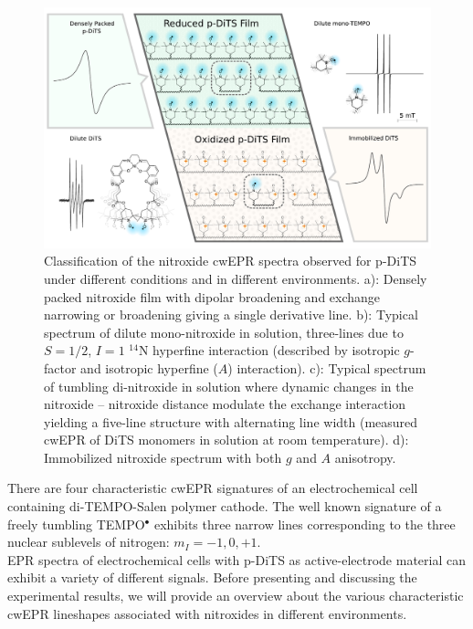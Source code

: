 \begin{figure}[H]
\center
	\includegraphics[width=1\textwidth]{./operando_epr/figures/Cartoon_ALL.pdf}
	\caption{Classification of the nitroxide cwEPR spectra observed for p-DiTS under different conditions and in different environments. a): Densely packed nitroxide film with dipolar broadening and exchange narrowing or broadening giving a single derivative line. b): Typical spectrum of dilute mono-nitroxide in solution, three-lines due to $S=1/2$, $I=1$ $^{14}$N hyperfine interaction (described by isotropic $g$-factor and isotropic hyperfine ($A$) interaction). c): Typical spectrum of tumbling di-nitroxide in solution where dynamic changes in the nitroxide -- nitroxide distance modulate the exchange interaction yielding a five-line structure with alternating line width (measured cwEPR of DiTS monomers in solution at room temperature). d): Immobilized nitroxide spectrum with both $g$ and $A$ anisotropy.}
	\label{fig:cartoon_spectra_dts}
\end{figure}

There are four characteristic cwEPR signatures of an electrochemical cell containing di-TEMPO-Salen polymer cathode. The well known signature of a freely tumbling TEMPO$^{\bullet}$ exhibits three narrow lines corresponding to the three nuclear sublevels of nitrogen: $m_I=-1,0,+1$.\\

EPR spectra of electrochemical cells with p-DiTS as active-electrode material can exhibit a variety of different signals. Before presenting and discussing the experimental results, we will provide an overview about the various characteristic cwEPR lineshapes associated with nitroxides in different environments.
\par

